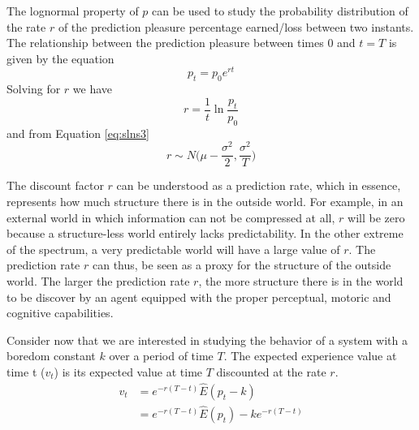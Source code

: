 \documentclass[11pt,twocolumn]{article}
\begin{document}
The lognormal property of $p$ can be used to study the
probability distribution of the rate $r$ of the prediction pleasure percentage earned/loss between two instants.
The relationship between the prediction pleasure between times 0 and $t=T$ is given by the equation
\begin{equation*}
   p_t = p_0 e^{r t}
\label{eq:vpbpt}
\end{equation*}
Solving for $r$ we have
\begin{equation*}
   r = \frac{1}{t}\ln \frac{p_t}{p_0}
\label{eq:vpbpt2}
\end{equation*}
and from Equation \ref{eq:slns3} 
\begin{equation}
   r \sim  N \bigg( \mu - \frac{\sigma ^2}{2} , \frac{\sigma^2}{T} \bigg) 
\label{eq:vpbpt3}
\end{equation}

The discount factor $r$ can be understood as a prediction rate, which in essence, represents how much structure there is in the outside world. For example, in an external world in which information can not be compressed at all, $r$ will be zero because a structure-less world entirely lacks predictability. In the other extreme of the spectrum, a very predictable world will have a large value of $r$. 
The prediction rate $r$ can thus, be seen as a proxy for the structure of the outside world. The larger the prediction rate $r$, the more structure there is in the world to be discover by an agent equipped with the proper perceptual, motoric and cognitive capabilities. 

Consider now that we are interested in studying the behavior of a system with a boredom constant $k$ over a period of time $T$. The expected experience value at time t ($v_t$) is its expected value at time $T$ discounted at the rate $r$.  
\begin{equation}
\begin{split}
    v_t  & =  e^{-r(T-t)}\hat{E}(p_{t} - k)  \\
       & = e^{-r(T-t)}\hat{E}(p_{t}) - k e^{-r(T-t)} \\
\end{split}
\label{eq:discf}
\end{equation}
\end{document}
